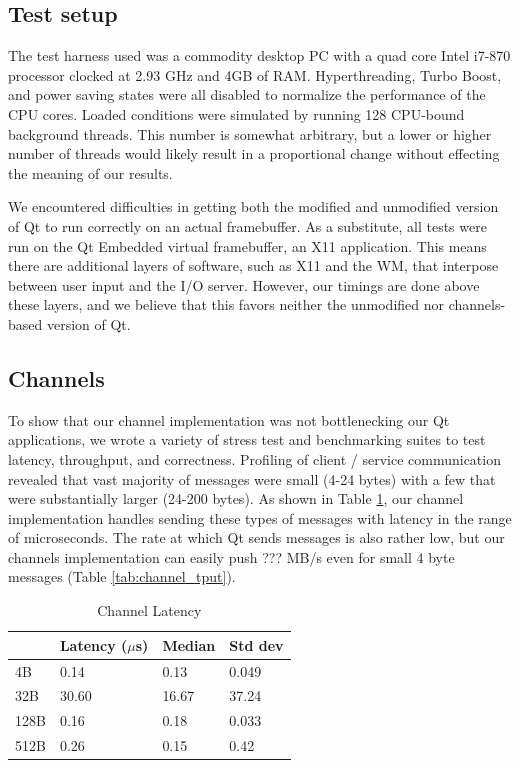 \documentclass[letterpaper,twocolumn,10pt]{article}
\begin{document}
\subsection{Test setup}

The test harness used was a commodity desktop PC with a quad core Intel i7-870 processor clocked at 2.93 GHz and 4GB of RAM. Hyperthreading, Turbo Boost, and power saving states were all disabled to normalize the performance of the CPU cores. Loaded conditions were simulated by running 128 CPU-bound background threads. This number is somewhat arbitrary, but a lower or higher number of threads would likely result in a proportional change without effecting the meaning of our results.

We encountered difficulties in getting both the modified and unmodified version of Qt to run correctly on an actual framebuffer. As a substitute, all tests were run on the Qt Embedded virtual framebuffer, an X11 application. This means there are additional layers of software, such as X11 and the WM, that interpose between user input and the I/O server. However, our timings are done above these layers, and we believe that this favors neither the unmodified nor channels-based version of Qt.

\subsection{Channels}

To show that our channel implementation was not bottlenecking our Qt applications, we wrote a variety of stress test and benchmarking suites to test latency, throughput, and correctness. Profiling of client / service communication revealed that vast majority of messages were small (4-24 bytes) with a few that were substantially larger (24-200 bytes). As shown in Table \ref{tab:channel_latency}, our channel implementation handles sending these types of messages with latency in the range of microseconds. The rate at which Qt sends messages is also rather low, but our channels implementation can easily push ??? MB/s even for small 4 byte messages (Table \ref{tab:channel_tput}).

\begin{table}[tp]
\caption{Channel Latency}
\label{tab:channel_latency}
\centering
\begin{tabular}{|l | l | l | l |}
\hline
		&Latency ($\mu$s)	&Median	&Std dev\\ \hline
4B		&0.14	&0.13	&0.049\\
32B		&30.60	&16.67	&37.24\\
128B	&0.16	&0.18	&0.033\\
512B	&0.26	&0.15	&0.42\\
\hline
\end{tabular}
\end{table}
\end{document}
